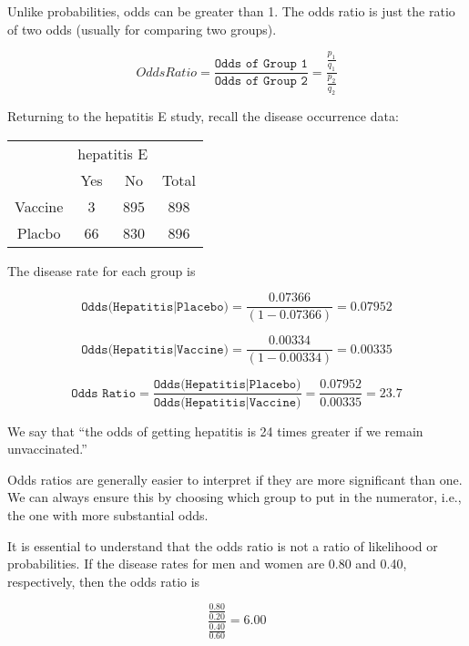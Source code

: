 \documentclass[11pt]{book}\usepackage[]{graphicx}\usepackage[]{color}
\begin{document}
Unlike probabilities, odds can be greater than 1.  The odds ratio is just the ratio of two odds (usually for comparing two groups).

\begin{equation*}
  Odds Ratio = \frac{ \texttt{Odds of Group 1}}{\texttt{Odds of Group 2}} = \frac{ \frac{p_1}{q_1}}{ \frac{p_2}{q_2}}
\end{equation*}

Returning to the hepatitis E study, recall the disease occurrence data:

\begin{table}[ht]
\centering
\begin{tabular}{@{} cccc @{}} \hline
 & \multicolumn{2}{c}{hepatitis E} \\
 & Yes & No & Total \\ \hline
 Vaccine & 3 & 895 & 898 \\
 Placbo  & 66 & 830 & 896 \\ \hline
 \end{tabular}
 \end{table}

The disease rate for each group is

\begin{equation*}
  \texttt{Odds(Hepatitis|Placebo)} = \frac{0.07366}{(1 - 0.07366)} = 0.07952
\end{equation*}

\begin{equation*}
  \texttt{Odds(Hepatitis|Vaccine)} = \frac{0.00334}{(1 - 0.00334)} = 0.00335
\end{equation*}

\begin{equation*}
  \texttt{Odds Ratio} = \frac{\texttt{Odds(Hepatitis|Placebo)}}{\texttt{Odds(Hepatitis|Vaccine)}} = \frac{0.07952}{0.00335} = 23.7
\end{equation*}

We say that ``the odds of getting hepatitis is 24 times greater if we remain unvaccinated.''

Odds ratios are generally easier to interpret if they are more significant than one.  We can always ensure this by choosing which group to put in the numerator, i.e., the one with more substantial odds.

It is essential to understand that the odds ratio is not a ratio of likelihood or probabilities.  If the disease rates for men and women are 0.80 and 0.40, respectively, then the odds ratio is

\begin{equation*}
   \frac{ \frac{0.80}{0.20}}{ \frac{0.40}{0.60}} = 6.00
\end{equation*}
\end{document}
